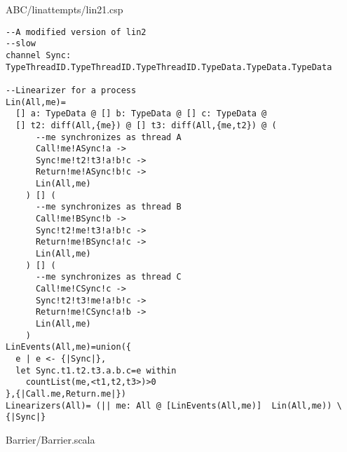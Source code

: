 ABC/linattempts/lin21.csp
\begin{lstlisting}
--A modified version of lin2
--slow
channel Sync: TypeThreadID.TypeThreadID.TypeThreadID.TypeData.TypeData.TypeData

--Linearizer for a process
Lin(All,me)= 
  [] a: TypeData @ [] b: TypeData @ [] c: TypeData @
  [] t2: diff(All,{me}) @ [] t3: diff(All,{me,t2}) @ (
      --me synchronizes as thread A
      Call!me!ASync!a ->
      Sync!me!t2!t3!a!b!c ->
      Return!me!ASync!b!c ->
      Lin(All,me)
    ) [] (
      --me synchronizes as thread B
      Call!me!BSync!b ->
      Sync!t2!me!t3!a!b!c ->
      Return!me!BSync!a!c ->
      Lin(All,me)
    ) [] (
      --me synchronizes as thread C
      Call!me!CSync!c ->
      Sync!t2!t3!me!a!b!c ->
      Return!me!CSync!a!b ->
      Lin(All,me)
    )
LinEvents(All,me)=union({
  e | e <- {|Sync|},
  let Sync.t1.t2.t3.a.b.c=e within
    countList(me,<t1,t2,t3>)>0
},{|Call.me,Return.me|})
Linearizers(All)= (|| me: All @ [LinEvents(All,me)]  Lin(All,me)) \ {|Sync|}
\end{lstlisting}
Barrier/Barrier.scala
